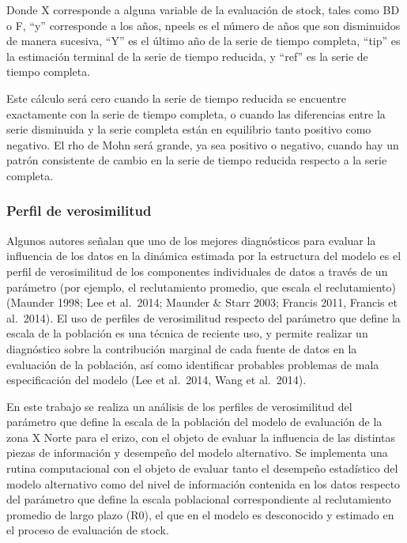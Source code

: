 \documentclass[
]{article}
\begin{document}
Donde X corresponde a alguna variable de la evaluación de stock, tales
como BD o F, ``y'' corresponde a los años, npeels es el número de años
que son disminuidos de manera sucesiva, ``Y'' es el último año de la
serie de tiempo completa, ``tip'' es la estimación terminal de la serie
de tiempo reducida, y ``ref'' es la serie de tiempo completa.

Este cálculo será cero cuando la serie de tiempo reducida se encuentre
exactamente con la serie de tiempo completa, o cuando las diferencias
entre la serie disminuida y la serie completa están en equilibrio tanto
positivo como negativo. El rho de Mohn será grande, ya sea positivo o
negativo, cuando hay un patrón consistente de cambio en la serie de
tiempo reducida respecto a la serie completa.

\hypertarget{perfil-de-verosimilitud}{%
\subsubsection{Perfil de verosimilitud}\label{perfil-de-verosimilitud}}

Algunos autores señalan que uno de los mejores diagnósticos para evaluar
la influencia de los datos en la dinámica estimada por la estructura del
modelo es el perfil de verosimilitud de los componentes individuales de
datos a través de un parámetro (por ejemplo, el reclutamiento promedio,
que escala el reclutamiento) (Maunder 1998; Lee et al.~2014; Maunder \&
Starr 2003; Francis 2011, Francis et al.~2014). El uso de perfiles de
verosimilitud respecto del parámetro que define la escala de la
población es una técnica de reciente uso, y permite realizar un
diagnóstico sobre la contribución marginal de cada fuente de datos en la
evaluación de la población, así como identificar probables problemas de
mala especificación del modelo (Lee et al.~2014, Wang et al.~2014).

En este trabajo se realiza un análisis de los perfiles de verosimilitud
del parámetro que define la escala de la población del modelo de
evaluación de la zona X Norte para el erizo, con el objeto de evaluar la
influencia de las distintas piezas de información y desempeño del modelo
alternativo. Se implementa una rutina computacional con el objeto de
evaluar tanto el desempeño estadístico del modelo alternativo como del
nivel de información contenida en los datos respecto del parámetro que
define la escala poblacional correspondiente al reclutamiento promedio
de largo plazo (R0), el que en el modelo es desconocido y estimado en el
proceso de evaluación de stock.
\end{document}
